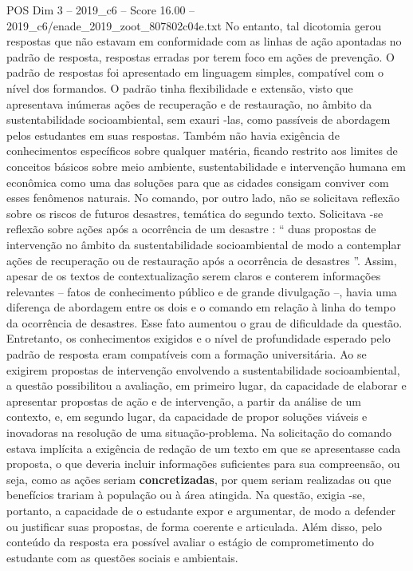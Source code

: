 \begin{textsample}{POS Dim 3 – 2019\_c6 – Score 16.00 – 2019\_c6/enade\_2019\_zoot\_807802c04e.txt}
No entanto, tal dicotomia gerou respostas que não estavam em conformidade com as linhas de ação apontadas no padrão de resposta, respostas erradas por terem foco em ações de prevenção.
O padrão de respostas foi apresentado em linguagem simples, compatível com o nível dos formandos.
O padrão tinha flexibilidade e extensão, visto que apresentava inúmeras ações de recuperação e de restauração, no âmbito da sustentabilidade socioambiental, sem exauri -las, como passíveis de abordagem pelos estudantes em suas respostas.
Também não havia exigência de conhecimentos específicos sobre qualquer matéria, ficando restrito aos limites de conceitos básicos sobre meio ambiente, sustentabilidade e intervenção humana em econômica como uma das soluções para que as cidades consigam conviver com esses fenômenos naturais.
No comando, por outro lado, não se solicitava reflexão sobre os riscos de futuros desastres, temática do segundo texto.
Solicitava -se reflexão sobre ações após a ocorrência de um desastre : “ duas propostas de intervenção no âmbito da sustentabilidade socioambiental de modo a contemplar ações de recuperação ou de restauração após a ocorrência de desastres ”.
Assim, apesar de os textos de contextualização serem claros e conterem informações relevantes – fatos de conhecimento público e de grande divulgação –, havia uma diferença de abordagem entre os dois e o comando em relação à linha do tempo da ocorrência de desastres.
Esse fato aumentou o grau de dificuldade da questão.
Entretanto, os conhecimentos exigidos e o nível de profundidade esperado pelo padrão de resposta eram compatíveis com a formação universitária.
Ao se exigirem propostas de intervenção envolvendo a sustentabilidade socioambiental, a questão possibilitou a avaliação, em primeiro lugar, da capacidade de elaborar e apresentar propostas de ação e de intervenção, a partir da análise de um contexto, e, em segundo lugar, da capacidade de propor soluções viáveis e inovadoras na resolução de uma situação-problema.
Na solicitação do comando estava implícita a exigência de redação de um texto em que se apresentasse cada proposta, o que deveria incluir informações suficientes para sua compreensão, ou seja, como as ações seriam \textbf{concretizadas}, por quem seriam realizadas ou que benefícios trariam à população ou à área atingida.
Na questão, exigia -se, portanto, a capacidade de o estudante expor e argumentar, de modo a defender ou justificar suas propostas, de forma coerente e articulada.
Além disso, pelo conteúdo da resposta era possível avaliar o estágio de comprometimento do estudante com as questões sociais e ambientais.

\end{textsample}
